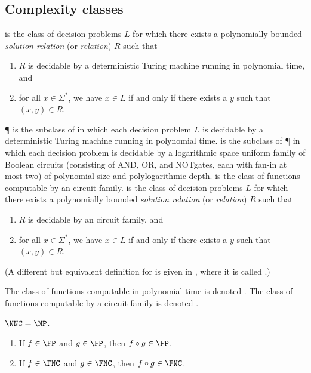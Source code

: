 \documentclass[]{article}
\newcommand{\AND}{\textsf{AND}}
\newcommand{\OR}{\textsf{OR}}
\newcommand{\NOT}{\textsf{NOT}}
\begin{document}
\subsection{Complexity classes}

\NP{} is the class of decision problems $L$ for which there exists a polynomially bounded \emph{solution relation} (or \emph{\NP{} relation}) $R$ such that
\begin{enumerate}
\item $R$ is decidable by a deterministic Turing machine running in polynomial time, and
\item for all $x \in \Sigma^*$, we have $x \in L$ if and only if there exists a $y$ such that $(x, y) \in R$.
\end{enumerate}
\P{} is the subclass of \NP{} in which each decision problem $L$ is decidable by a deterministic Turing machine running in polynomial time.
\NC{} is the subclass of \P{} in which each decision problem is decidable by a logarithmic space uniform family of Boolean circuits (consisting of \AND, \OR, and \NOT gates, each with fan-in at most two) of polynomial size and polylogarithmic depth.
\FNC{} is the class of functions computable by an \NC{} circuit family.
\NNC{} is the class of decision problems $L$ for which there exists a polynomially bounded \emph{solution relation} (or \emph{\NNC{} relation}) $R$ such that
\begin{enumerate}
\item $R$ is decidable by an \NC{} circuit family, and
\item for all $x \in \Sigma^*$, we have $x \in L$ if and only if there exists a $y$ such that $(x, y) \in R$.
\end{enumerate}
(A different but equivalent definition for \NNC{} is given in \cite{wolf94}, where it is called \NNCpoly.)

The class of functions computable in polynomial time is denoted \FP.
The class of functions computable by a \NC{} circuit family is denoted \FNC.

\begin{theorem}\label{thm:nncequalsnp}
  $\NNC = \NP$.
\end{theorem}

\begin{lemma}
  \mbox{}
  \begin{enumerate}
  \item If $f \in \FP$ and $g \in \FP$, then $f \circ g \in \FP$.
  \item If $f \in \FNC$ and $g \in \FNC$, then $f \circ g \in \FNC$.
  \end{enumerate}
\end{lemma}
\end{document}
